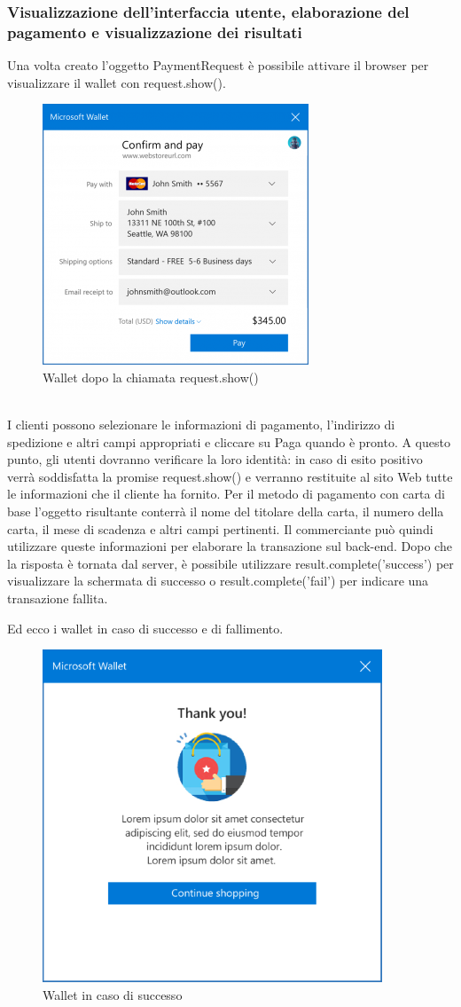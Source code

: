 \documentclass[11pt ,a4paper , twoside , openright ]{article}
\begin{document}
\subsubsection{Visualizzazione dell'interfaccia utente, elaborazione del pagamento e visualizzazione dei risultati}
Una volta creato l'oggetto PaymentRequest è possibile attivare il browser per visualizzare il wallet con request.show(). 
\begin{figure}[h]
	\centering
	\includegraphics[width=0.5\linewidth]{wallet1}
	\caption{Wallet dopo la chiamata request.show()}
	\label{fig: Wallet dopo la chiamata request.show()}
\end{figure}
\\
I clienti possono  selezionare le informazioni di pagamento, l'indirizzo di spedizione e altri campi appropriati e cliccare su Paga quando è pronto. A questo punto, gli utenti dovranno verificare la loro identità: in caso di esito positivo verrà soddisfatta la promise request.show() e verranno restituite al sito Web tutte le informazioni che il cliente ha fornito. Per il metodo di pagamento con carta di base l'oggetto risultante conterrà il nome del titolare della carta, il numero della carta, il mese di scadenza e altri campi pertinenti. Il commerciante può quindi utilizzare queste informazioni per elaborare la transazione sul back-end.
Dopo che la risposta è tornata dal server, è possibile utilizzare result.complete('success') per visualizzare la schermata di successo o result.complete('fail') per indicare una transazione fallita.

\pagebreak
Ed ecco i wallet in caso di successo e di fallimento.
\begin{figure}[h]
	\centering
	\includegraphics[width=0.5\linewidth]{wallet2}
	\caption{Wallet in caso di successo}
	\label{fig: Wallet in caso di successo}
\end{figure}
\end{document}
